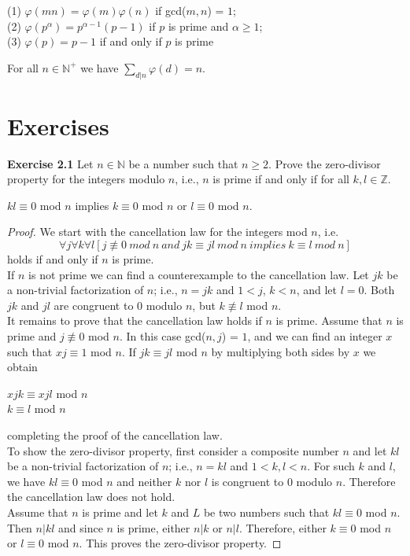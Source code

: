 \documentclass[a4paper]{article}
\begin{document}
\begin{theorem}
(1) $\varphi (mn) = \varphi (m) \varphi (n)$ if gcd($m, n$) = $1$; \\
(2) $\varphi (p^{\alpha}) = p^{\alpha - 1}(p - 1)$ if $p$ is prime and $\alpha \geq 1$; \\
(3) $\varphi(p) = p - 1$ if and only if $p$ is prime
\end{theorem}


\begin{theorem}
For all $n \in \mathbb{N}^{+}$ we have $\sum_{d|n} \varphi (d) = n$.
\end{theorem}



\section{Exercises}
\noindent \textbf{Exercise 2.1} Let $n \in \mathbb{N}$ be a number such that $n \geq 2$. Prove the zero-divisor property for the integers modulo $n$, i.e., $n$ is prime if and only if for all $k, l \in \mathbb{Z}$.
\begin{center}
$kl \equiv 0$ mod $n$ implies $k \equiv 0$ mod $n$ or $l \equiv 0$ mod $n$.
\end{center}
\begin{proof}
We start with the cancellation law for the integers mod $n$, i.e.
$$ \forall j \forall k \forall l[j \not \equiv 0\ mod\ n\ and\ jk \equiv jl\ mod\ n\ implies\ k \equiv l\ mod\ n]$$
holds if and only if $n$ is prime. \\
If $n$ is not prime we can find a counterexample to the cancellation law. Let $jk$ be a non-trivial factorization of $n$; i.e., $n = jk$ and $1 < j$, $k < n$, and let $l = 0$. Both $jk$ and $jl$ are congruent to $0$ modulo $n$, but $k \not \equiv l$ mod $n$.\\
It remains to prove that the cancellation law holds if $n$ is prime. Assume that $n$ is prime and $j \not \equiv 0$ mod $n$. In this case gcd($n, j$) = $1$, and we can find an integer $x$ such that $xj \equiv 1$ mod $n$. If $jk \equiv jl$ mod $n$ by multiplying both sides by $x$ we obtain
\begin{center}
$xjk \equiv xjl$ mod $n$\\
$k \equiv l$ mod $n$
\end{center}
completing the proof of the cancellation law.\\
To show the zero-divisor property, first consider a composite number $n$ and let $kl$ be a non-trivial factorization of $n$; i.e., $n = kl$ and $1 < k, l <n$. For such $k$ and $l$, we have $kl \equiv 0$ mod $n$ and neither $k$ nor $l$ is congruent to $0$ modulo $n$. Therefore the cancellation law does not hold.\\
Assume that $n$ is prime and let $k$ and $L$ be two numbers such that $kl \equiv 0$ mod $n$. Then $n|kl$ and since $n$ is prime, either $n|k$ or $n|l$. Therefore, either $k \equiv 0$ mod $n$ or $l \equiv 0$ mod $n$. This proves the zero-divisor property.
\end{proof}
\end{document}
